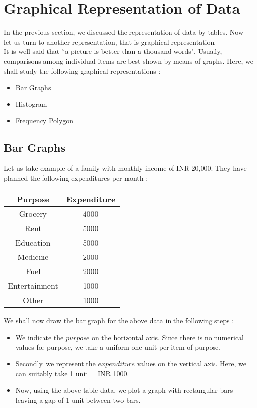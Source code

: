 \documentclass[12pt, letterpaper]{article}
\begin{document}
\section{Graphical Representation of Data}
In the previous section, we discussed the representation of data by tables. Now let us turn to another representation, that is graphical representation.\\
It is well said that ``a picture is better than a thousand words". Usually, comparisons among individual items are best shown by means of graphs. Here, we shall study the following graphical representations : 
\begin{itemize}
    \item Bar Graphs
    \item Histogram
    \item Frequency Polygon
\end{itemize}
\subsection{Bar Graphs}
Let us take example of a family with monthly income of INR 20,000. They have planned
the following expenditures per month : 
\begin{center}
\begin{tabular}{ |c|c| } 
 \hline
 \textbf{Purpose} & \textbf{Expenditure} \\
 \hline
 Grocery & 4000 \\ 
 Rent & 5000 \\
 Education & 5000 \\
 Medicine & 2000 \\
 Fuel & 2000 \\
 Entertainment & 1000 \\
 Other & 1000 \\
 \hline
\end{tabular}
\end{center}
We shall now draw the bar graph for the above data in the following steps : 
\begin{itemize}
    \item We indicate the $purpose$ on the horizontal axis. Since there is no numerical values for purpose, we take a uniform one unit per item of purpose.
    \item Secondly, we represent the $expenditure$ values on the vertical axis. Here, we can suitably take 1 unit = INR 1000.
    \item Now, using the above table data, we plot a graph with rectangular bars leaving a gap of 1 unit between two bars.
\end{itemize}

\begin{center}
\end{center}
\end{document}
